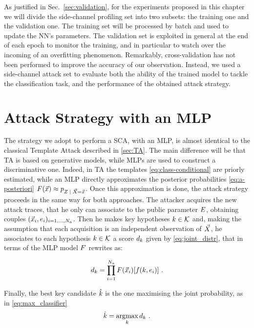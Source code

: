 As justified in Sec.~\ref{sec:validation}, for the experiments proposed in this chapter we will divide the side-channel profiling set into two subsets: the training one and the validation one. The training set will be processed by batch and used to update the NN's parameters. The validation set is exploited in general at the end of each epoch to monitor the training, and in particular to watch over the incoming of an overfitting phenomenon. Remarkably, cross-validation has not been performed to improve the accuracy of our observation. Instead, we used a side-channel attack set to  evaluate both the ability of the trained model to tackle the classification task, and the performance of the obtained attack strategy.

\section{Attack Strategy with an MLP}\label{sec:attackNN}
The strategy we adopt to perform a SCA, with an MLP, is almost identical to the classical Template Attack described in \ref{sec:TA}. The main difference will be that TA is based on generative models, while MLPs are used to construct a discriminative one. Indeed, in TA the templates \eqref{eq:class-conditional} are priorly estimated, while an MLP directly approximates the posterior probabilities \eqref{eq:a-posteriori} $\MLmodel(\vLeakVec) \approx \pdf_{\given{\sensRandVar}{\vaLeakVec=\vLeakVec}}$. Once this approximation is done, the attack strategy proceeds in the same way for both approaches. The attacker acquires the new attack traces, that he only can associate to the public parameter $E$, obtaining couples  $(\vec{x}_i, e_i)_{i=1, \dots , N_a}$. Then he makes key hypotheses $k \in \mathcal{K}$ and, making the assumption that each acquisition is an independent observation of $\vec{X}$, he associates to each hypothesis $k \in \mathcal{K}$ a score $d_k$ given by \eqref{eq:joint_distr}, that in terms of the MLP model $F$ rewrites  as:

\begin{equation}\label{eq:NN_SCA}
d_{k} = \prod_{i=1}^{N_a} F(\vec{x}_i)[f(k,e_i)] \mbox{ .}
\end{equation}

Finally, the best key candidate $\hat{k}$ is the one maximising the joint probability, as in \eqref{eq:max_classifier}
\begin{equation}
\hat{k} = \operatorname*{argmax}_{k} d_{k} \mbox{ .}
\end{equation}


